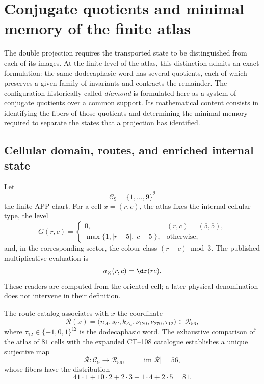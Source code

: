 \section[Conjugate quotients and minimal memory]{Conjugate quotients and
minimal memory of the finite atlas}
\label{sec:cocientes-conjugados-rev11}

The double projection requires the transported state to be distinguished from each of its images. At the finite level of the atlas, this distinction admits an exact formulation: the same dodecaphasic word has several quotients, each of which preserves a given family of invariants and contracts the remainder. The configuration historically called \emph{diamond} is formulated here as a system of conjugate quotients over a common support. Its mathematical content consists in identifying the fibers of those quotients and determining the minimal memory required to separate the states that a projection has identified.

\subsection{Cellular domain, routes, and enriched internal state}

Let
\[
 \mathcal C_9=\{1,\ldots,9\}^2
\]
the finite APP chart. For a cell \(x=(r,c)\), the atlas fixes the internal
cellular type, the level
\[
 G(r,c)=
 \begin{cases}
 0,&(r,c)=(5,5),\\
 \max\{1,|r-5|,|c-5|\},&\text{otherwise},
 \end{cases}
\]
and, in the corresponding sector, the colour class \((r-c)\bmod 3\). The
published multiplicative evaluation is
\[
 a_{\times}(r,c)=\dr(rc).
\]
These readers are computed from the oriented cell; a later physical denomination
does not intervene in their definition.

The route catalog associates with \(x\) the coordinate
\[
 \mathcal R(x)=
 \bigl(n_A,s_C,k_{\Delta_4},\nu_{120},\nu_{270},\tau_{12}\bigr)
 \in\mathscr R_{56},
\]
where \(\tau_{12}\in\{-1,0,1\}^{12}\) is the dodecaphasic word. The
exhaustive comparison of the atlas of \(81\) cells with the expanded CT--108
catalogue establishes a unique surjective map
\[
 \mathcal R:\mathcal C_9\longrightarrow\mathscr R_{56},
 \qquad |\operatorname{im}\mathcal R|=56,
\]
whose fibers have the distribution
\begin{equation}
 41\cdot1+10\cdot2+2\cdot3+1\cdot4+2\cdot5=81.
 \label{eq:fibras-r56-rev11}
\end{equation}

